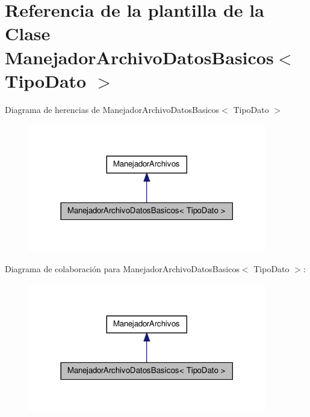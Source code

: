 \hypertarget{class_manejador_archivo_datos_basicos}{\section{\-Referencia de la plantilla de la \-Clase \-Manejador\-Archivo\-Datos\-Basicos$<$ \-Tipo\-Dato $>$}
\label{class_manejador_archivo_datos_basicos}
}


\-Diagrama de herencias de \-Manejador\-Archivo\-Datos\-Basicos$<$ \-Tipo\-Dato $>$
\nopagebreak
\begin{figure}[H]
\begin{center}
\leavevmode
\includegraphics[width=294pt]{class_manejador_archivo_datos_basicos__inherit__graph}
\end{center}
\end{figure}


\-Diagrama de colaboración para \-Manejador\-Archivo\-Datos\-Basicos$<$ \-Tipo\-Dato $>$\-:
\nopagebreak
\begin{figure}[H]
\begin{center}
\leavevmode
\includegraphics[width=294pt]{class_manejador_archivo_datos_basicos__coll__graph}
\end{center}
\end{figure}
